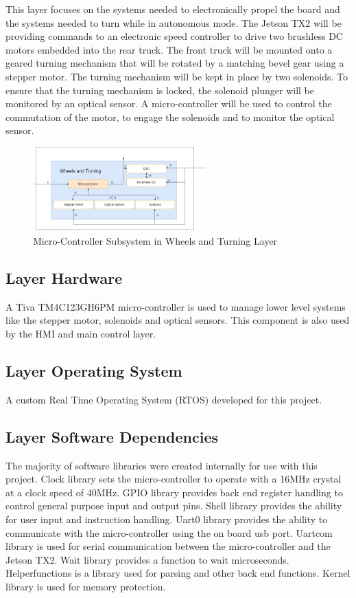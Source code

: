 This layer focuses on the systems needed to electronically propel the board and the systems needed to turn while in autonomous mode. The Jetson TX2 will be providing commands to an electronic speed controller to drive two brushless DC motors embedded into the rear truck. The front truck will be mounted onto a geared turning mechanism that will be rotated by a matching bevel gear using a stepper motor. The turning mechanism will be kept in place by two solenoids. To ensure that the turning mechanism is locked, the solenoid plunger will be monitored by an optical sensor. A micro-controller will be used to control the commutation of the motor, to engage the solenoids and to monitor the optical sensor.

\begin{figure}[h!]
	\centering
 	\includegraphics[width=0.60\textwidth]{images/Keaton/MicroC.png}
 \caption{Micro-Controller Subsystem in Wheels and Turning Layer}
\end{figure}

\subsection{Layer Hardware}
A Tiva TM4C123GH6PM micro-controller is used to manage lower level systems like the stepper motor, solenoids and optical sensors. This component is also used by the HMI and main control layer.

\subsection{Layer Operating System}
A custom Real Time Operating System (RTOS) developed for this project.

\subsection{Layer Software Dependencies}
The majority of software libraries were created internally for use with this project. Clock library sets the micro-controller to operate with a 16MHz crystal at a clock speed of 40MHz. GPIO library provides back end register handling to control general purpose input and output pins. Shell library provides the ability for user input and instruction handling. Uart0 library provides the ability to communicate with the micro-controller using the on board usb port. Uartcom library is used for serial communication between the micro-controller and the Jetson TX2. Wait library provides a function to wait microseconds. Helperfunctions is a library used for parsing and other back end functions. Kernel library is used for memory protection.

